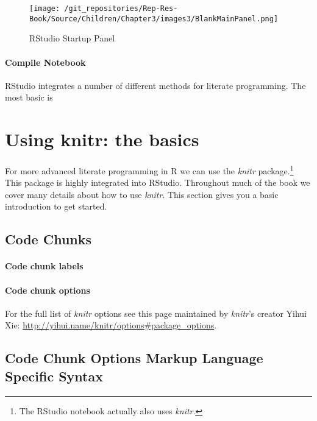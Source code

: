 \documentclass[ChapterTOCs,krantz1]{krantz}\usepackage{graphicx, color}
\begin{document}
\begin{figure}[ht]
    \caption{RStudio Startup Panel}
    \label{BlankMain}
    \begin{center}
    \texttt{[image: /git\_repositories/Rep-Res-Book/Source/Children/Chapter3/images3/BlankMainPanel.png]}
    \end{center}
\end{figure}

\paragraph{Compile Notebook}

RStudio integrates a number of different methods for literate programming. The most basic is 

\section{Using knitr: the basics}

For more advanced literate programming in R we can use the {\emph{knitr}} package.\footnote{The RStudio notebook actually also uses {\emph{knitr}}.} This package is highly integrated into RStudio. Throughout much of the book we cover many details about how to use {\emph{knitr}}. This section gives you a basic introduction to get started.

\subsection{Code Chunks}

\paragraph{Code chunk labels}

\paragraph{Code chunk options}

For the full list of {\emph{knitr}} options see this page maintained by {\emph{knitr}}'s creator Yihui Xie: \url{http://yihui.name/knitr/options#package_options}.

\subsection{Code Chunk Options Markup Language Specific Syntax}
\end{document}
